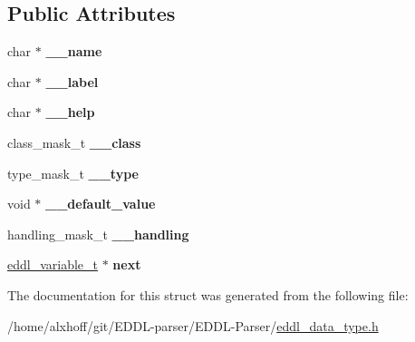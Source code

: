 \subsection*{Public Attributes}
\begin{DoxyCompactItemize}
\item 
char $\ast$ {\bfseries \+\_\+\+\_\+name}\hypertarget{structeddl__variable_a79f72869d00e12136428752dfc7569d6}{}\label{structeddl__variable_a79f72869d00e12136428752dfc7569d6}

\item 
char $\ast$ {\bfseries \+\_\+\+\_\+label}\hypertarget{structeddl__variable_a548592853cc4e7a9430c3321407fca0a}{}\label{structeddl__variable_a548592853cc4e7a9430c3321407fca0a}

\item 
char $\ast$ {\bfseries \+\_\+\+\_\+help}\hypertarget{structeddl__variable_a235acfb1be68c32d2dee20eef45d0ff5}{}\label{structeddl__variable_a235acfb1be68c32d2dee20eef45d0ff5}

\item 
class\+\_\+mask\+\_\+t {\bfseries \+\_\+\+\_\+class}\hypertarget{structeddl__variable_a0364f90161275d87a06a162e64d74205}{}\label{structeddl__variable_a0364f90161275d87a06a162e64d74205}

\item 
type\+\_\+mask\+\_\+t {\bfseries \+\_\+\+\_\+type}\hypertarget{structeddl__variable_ada222428d7b8f70f69b6a429a03d881a}{}\label{structeddl__variable_ada222428d7b8f70f69b6a429a03d881a}

\item 
void $\ast$ {\bfseries \+\_\+\+\_\+default\+\_\+value}\hypertarget{structeddl__variable_a63447d16a05e098f3c24300b71a9aa85}{}\label{structeddl__variable_a63447d16a05e098f3c24300b71a9aa85}

\item 
handling\+\_\+mask\+\_\+t {\bfseries \+\_\+\+\_\+handling}\hypertarget{structeddl__variable_a4b412eb47c4a289a25a035a5dfe8e0fb}{}\label{structeddl__variable_a4b412eb47c4a289a25a035a5dfe8e0fb}

\item 
\hyperlink{structeddl__variable}{eddl\+\_\+variable\+\_\+t} $\ast$ {\bfseries next}\hypertarget{structeddl__variable_ade1f619bd50d2bea65354beef55fbd94}{}\label{structeddl__variable_ade1f619bd50d2bea65354beef55fbd94}

\end{DoxyCompactItemize}


The documentation for this struct was generated from the following file\+:\begin{DoxyCompactItemize}
\item 
/home/alxhoff/git/\+E\+D\+D\+L-\/parser/\+E\+D\+D\+L-\/\+Parser/\hyperlink{eddl__data__type_8h}{eddl\+\_\+data\+\_\+type.\+h}\end{DoxyCompactItemize}
